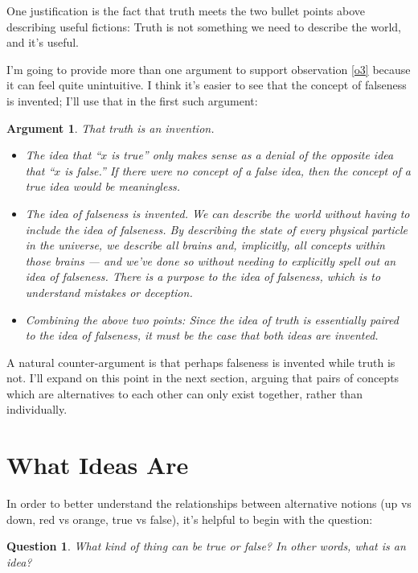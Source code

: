 \documentclass[11pt, oneside]{article}
\newtheorem*{question*}{Question}
\theoremstyle{argtstyle}
\newtheorem*{argt}{Argument}
\begin{document}
One justification is the fact that truth meets the two bullet points
above describing useful fictions:
Truth is not something we need to describe the world, and it's useful.

I'm going to provide more than one argument to support observation \ref{o3}
because it can feel quite unintuitive.
I think it's easier to see that the concept
of falseness is invented; I'll use that
in the first such argument:
\begin{argt} That truth is an invention.
    \label{a2}
    \normalfont
    \begin{itemize}
        \item
            The idea that ``$x$ is true'' only makes sense as a denial of the
            opposite idea that ``$x$ is false.'' If there were no concept of a
            false idea, then the concept of a true idea would be meaningless.
        \item
            The idea of falseness is invented. We can describe
            the world without having to include the idea of falseness.
            By describing the state of every physical particle in the universe,
            we describe all brains and, implicitly, all concepts
            within those brains --- and we've done so without
            needing to explicitly spell out an idea of falseness.
            There is a purpose to the idea of falseness, which is to understand
            mistakes or deception.
        \item
            Combining the above two points:
            Since the idea of truth is essentially paired to the idea of
            falseness,
            it must be the case that both ideas are invented.
    \end{itemize}
\end{argt}

A natural counter-argument is that perhaps falseness is invented while truth is
not.
I'll expand on this point in the next section,
arguing that pairs of concepts which are alternatives to
each other can only exist together,
rather than individually.

\section{What Ideas Are}

In order to better understand the relationships between alternative
notions (up vs down, red vs orange, true vs false), it's
helpful to begin with the question:
\begin{question*}
    What kind of thing can be true or false?
    In other words, what is an idea?
\end{question*}
\end{document}
